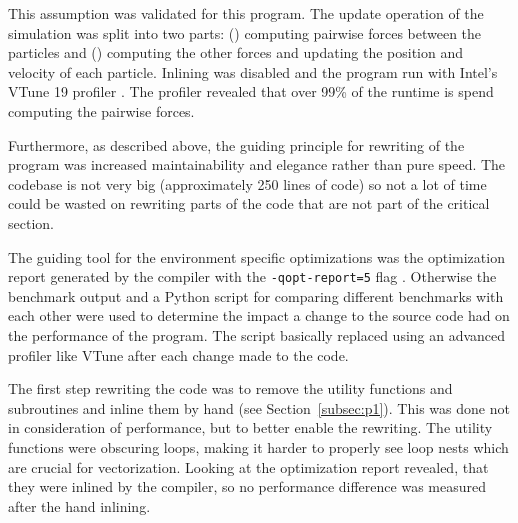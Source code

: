 \documentclass[twoside,11pt]{article}
\begin{document}
This assumption was validated for this program.
The update operation of the simulation was split into two parts:
() computing pairwise forces between the particles and
() computing the other forces and updating the position
and velocity of each particle.
Inlining was disabled and the program run with Intel's VTune 19
profiler \citep{vtune}.
The profiler revealed that over 99\% of the runtime is spend computing
the pairwise forces.

Furthermore, as described above, the guiding principle for rewriting
of the program was increased maintainability and elegance rather than
pure speed.
The codebase is not very big (approximately 250 lines of code) so not
a lot of time could be wasted on rewriting parts of the code that are
not part of the critical section.

The guiding tool for the environment specific optimizations was the
optimization report generated by the compiler with the
\texttt{-qopt-report=5} flag \citep{qopt_report}.
Otherwise the benchmark output and a Python script for comparing
different benchmarks with each other were used to determine the impact
a change to the source code had on the performance of the program.
The script basically replaced using an advanced profiler like VTune
after each change made to the code.

The first step rewriting the code was to remove the utility functions
and subroutines and inline them by hand (see Section~\ref{subsec:p1}).
This was done not in consideration of performance, but to better
enable the rewriting.
The utility functions were obscuring loops, making it harder to
properly see loop nests which are crucial for vectorization.
Looking at the optimization report revealed, that they were inlined
by the compiler, so no performance difference was measured after
the hand inlining.
\end{document}
